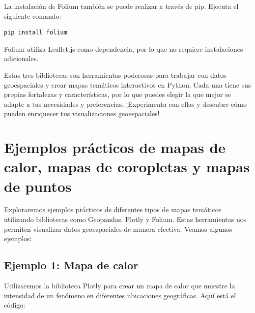 \documentclass[
  a4paper,
]{article}
\begin{document}
La instalación de Folium también se puede realizar a través de pip.
Ejecuta el siguiente comando:

\begin{verbatim}
pip install folium
\end{verbatim}

Folium utiliza Leaflet.js como dependencia, por lo que no requiere
instalaciones adicionales.

Estas tres bibliotecas son herramientas poderosas para trabajar con
datos geoespaciales y crear mapas temáticos interactivos en Python. Cada
una tiene sus propias fortalezas y características, por lo que puedes
elegir la que mejor se adapte a tus necesidades y preferencias.
¡Experimenta con ellas y descubre cómo pueden enriquecer tus
visualizaciones geoespaciales!

\hypertarget{ejemplos-pruxe1cticos-de-mapas-de-calor-mapas-de-coropletas-y-mapas-de-puntos}{%
\section{Ejemplos prácticos de mapas de calor, mapas de coropletas y
mapas de
puntos}\label{ejemplos-pruxe1cticos-de-mapas-de-calor-mapas-de-coropletas-y-mapas-de-puntos}}

Exploraremos ejemplos prácticos de diferentes tipos de mapas temáticos
utilizando bibliotecas como Geopandas, Plotly y Folium. Estas
herramientas nos permiten visualizar datos geoespaciales de manera
efectiva. Veamos algunos ejemplos:

\hypertarget{ejemplo-1-mapa-de-calor}{%
\subsection{Ejemplo 1: Mapa de calor}\label{ejemplo-1-mapa-de-calor}}

Utilizaremos la biblioteca Plotly para crear un mapa de calor que
muestre la intensidad de un fenómeno en diferentes ubicaciones
geográficas. Aquí está el código:
\end{document}
